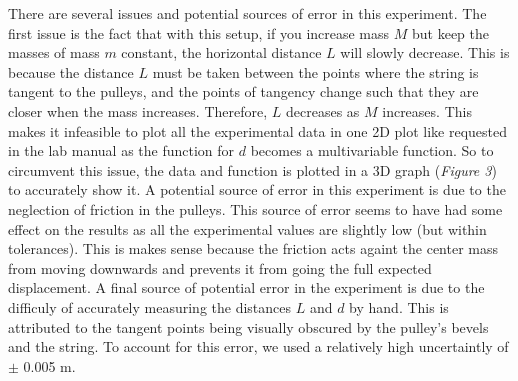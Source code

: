 \documentclass[12pt,letterpaper]{article}
\begin{document}
{{{There are several issues and potential sources of error in this experiment. The first issue is the fact that with this setup, if you increase mass \(M\) but keep the masses of mass \(m\) constant, the horizontal distance \(L\) will slowly decrease. This is because the distance \(L\) must be taken between the points where the string is tangent to the pulleys, and the points of tangency change such that they are closer when the mass increases. Therefore, \(L\) decreases as \(M\) increases. This makes it infeasible to plot all the experimental data in one 2D plot like requested in the lab manual as the function for \(d\) becomes a multivariable function. So to circumvent this issue, the data and function is plotted in a 3D graph (\textit{Figure 3}) to accurately show it. A potential source of error in this experiment is due to the neglection of friction in the pulleys. This source of error seems to have had some effect on the results as all the experimental values are slightly low (but within tolerances). This is makes sense because the friction acts againt the center mass from moving downwards and prevents it from going the full expected displacement. A final source of potential error in the experiment is due to the difficuly of accurately measuring the distances \(L\) and \(d\) by hand. This is attributed to the tangent points being visually obscured by the pulley's bevels and the string. To account for this error, we used a relatively high uncertaintly of \(\pm\) 0.005 m. 

}}}
\end{document}
